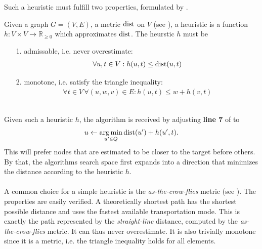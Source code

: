 	Such a heuristic must fulfill two properties, formulated by .
	\begin{mydef}\label{heuristic}
		Given a graph $G = (V, E)$, a metric $\operatorname{dist}$ on $V$ (see ),
		a \textnormal{heuristic} is a function $h: V \times V \to \mathbb{R}_{\ge 0}$ which approximates $\operatorname{dist}$.
		The heurstic $h$ must be
		\begin{itemize}
			\item[1.] \textnormal{admissable}, i.e. never overestimate:
				\begin{align*}
					\forall u, t \in V: h(u, t) \le \operatorname{dist}(u, t)
				\end{align*}
			\item[2.] \textnormal{monotone}, i.e. satisfy the triangle inequality:
				\begin{align*}
					\forall t \in V\,\forall (u, w, v) \in E: h(u, t) \le w + h(v, t)
				\end{align*}
		\end{itemize}
	\end{mydef}\quad\\
	Given such a heuristic $h$, the \astar algorithm is received by adjusting \textbf{line 7} of  to
	\begin{align*}
		u \leftarrow \operatorname*{arg\,min}_{u' \in Q} \operatorname{dist}(u') + h(u', t).
	\end{align*}
	This will prefer nodes that are estimated to be closer to the target before others. By that, the algorithms search space
	first expands into a direction that minimizes the distance according to the heuristic $h$.\\\\
	A common choice for a simple heuristic is the \textit{as-the-crow-flies} metric (see ).
	The properties are easily verified. A theoretically shortest path has the shortest possible distance and uses
	the fastest available transportation mode. This is exactly the path represented by the \textit{straight-line} distance,
	computed by the \textit{as-the-crow-flies} metric. It can thus never overestimate. It is also trivially monotone since it is a metric,
	i.e. the triangle inequality holds for all elements.
	
